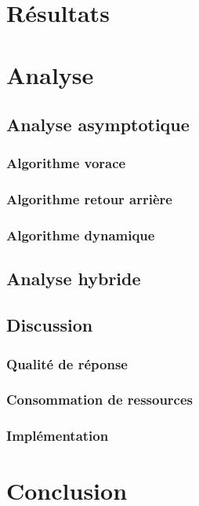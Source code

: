 \documentclass[10pt,a4paper]{article}
\begin{document}
\section{Résultats}

\section{Analyse}

\subsection{Analyse asymptotique}

\subsubsection{Algorithme vorace}
\subsubsection{Algorithme retour arrière}
\subsubsection{Algorithme dynamique}

\subsection{Analyse hybride}

\subsection{Discussion}

\subsubsection{Qualité de réponse}

\subsubsection{Consommation de ressources}

\subsubsection{Implémentation}

\section{Conclusion}
\end{document}
